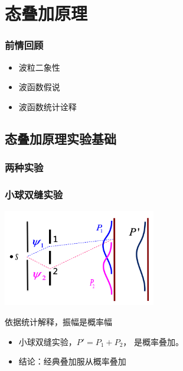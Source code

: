 \section{态叠加原理}

\begin{frame}
    \frametitle{前情回顾}
    \begin{itemize}
        \item 波粒二象性
        \item 波函数假说
        \item 波函数统计诠释
    \end{itemize}
\end{frame}  

\subsection{态叠加原理实验基础}

\begin{frame}
    \frametitle{两种实验}
        \begin{figure}
            \centering
        \end{figure}
\end{frame}

\begin{frame}
    \frametitle{小球双缝实验}
    \begin{center}
        \includegraphics[width=0.5\textwidth]{figs/sup-2.png} \\
    \end{center} 
    依据统计解释，振幅是概率幅\\
    \begin{itemize}
        \item 小球双缝实验，$P'=P_1+P_2 $， 是概率叠加。
        \item 结论：经典叠加服从概率叠加
    \end{itemize}
\end{frame} 



